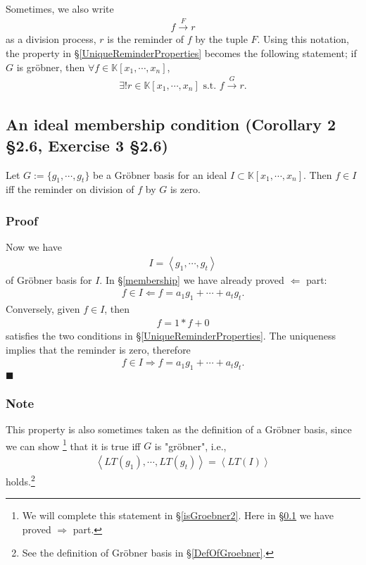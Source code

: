 \documentclass[11pt]{book}
\begin{document}
Sometimes, we also write
\begin{eqnarray}
f \stackrel{F}{\to} r %
\end{eqnarray}
as a division process, $r$ is the reminder of $f$ by the tuple $F$.
Using this notation, the property in \S\ref{UniqueReminderProperties} becomes the following statement; if $G$ is gr\"obner, then $\forall f \in \mathbb{K}[x_1, \cdots, x_n]$,
\begin{eqnarray}
\exists! r \in \mathbb{K}[x_1, \cdots, x_n] \text{ s.t. } f \stackrel{G}{\to} r.
\end{eqnarray}

\subsection{An ideal membership condition (Corollary 2 \S2.6, Exercise 3 \S2.6)}
\label{IMC}
Let $G := \{g_1, \cdots, g_t\} $ be a Gr\"obner basis for an ideal $I \subset \mathbb{K}[x_1, \cdots, x_n]$.
Then $f \in I$ iff the reminder on division of $f$ by $G$ is zero.

\subsubsection{Proof}
Now we have
\begin{eqnarray}
I = \left< g_1, \cdots, g_t\right>
\end{eqnarray}
of Gr\"obner basis for $I$.
In \S\ref{membership} we have already proved $\Leftarrow$ part:
\begin{eqnarray}
f \in I \Leftarrow f = a_1 g_1 + \cdots + a_t g_t.
\end{eqnarray}
Conversely, given $f \in I$, then
\begin{eqnarray}
f = 1*f+0
\end{eqnarray}
satisfies the two conditions in \S\ref{UniqueReminderProperties}.
The uniqueness implies that the reminder is zero, therefore
\begin{eqnarray}
f \in I \Rightarrow f = a_1 g_1 + \cdots + a_t g_t.
\end{eqnarray}
$\blacksquare$

\subsubsection{Note}
This property is also sometimes taken as the definition of a Gr\"obner basis, since we can show \footnote{We will complete this statement in \S\ref{isGroebner2}.
Here in \S\ref{IMC} we have proved $\Rightarrow$ part.
} that it is true iff $G$ is "gr\"obner", i.e.,
\begin{eqnarray}
\left< LT(g_1), \cdots, LT(g_t) \right> = \left< LT(I)\right>
\end{eqnarray}
holds.\footnote{See the definition of Gr\"obner basis in \S\ref{DefOfGroebner}.}
\end{document}
